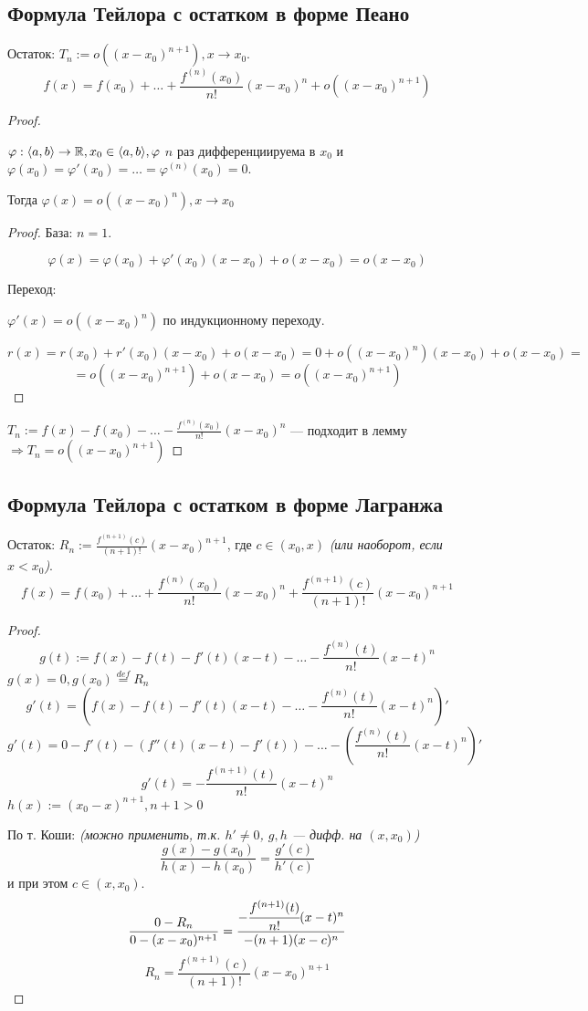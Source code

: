 \subsection{Формула Тейлора с остатком в форме Пеано}
Остаток: $T_n:=o((x-x_0)^{n+1}), x\to x_0$.
$$f(x)=f(x_0)+\ldots+\frac{f^{(n)}(x_0)}{n!}(x-x_0)^n+o((x-x_0)^{n+1})$$
\begin{proof}
    \begin{lemma}
        $\varphi:\langle a,b \rangle \to \mathbb{R}, x_0 \in \langle a,b \rangle, \varphi$ $n$ раз дифференциируема в $x_0$ и $\varphi(x_0)=\varphi'(x_0)=\ldots=\varphi^{(n)}(x_0)=0$.
        
        Тогда $\varphi(x)=o((x-x_0)^n), x\to x_0$
        \begin{proof}
            База: $n=1$.

            $$\varphi(x)=\varphi(x_0)+\varphi'(x_0)(x-x_0)+o(x-x_0)=o(x-x_0)$$

            Переход:

            $\varphi'(x)=o((x-x_0)^n)$ по индукционному переходу.

            $$r(x)=r(x_0)+r'(x_0)(x-x_0)+o(x-x_0)=0+o((x-x_0)^n)(x-x_0)+o(x-x_0)=$$
            $$=o((x-x_0)^{n+1})+o(x-x_0)=o((x-x_0)^{n+1})$$
        \end{proof}
    \end{lemma}

    $T_n:=f(x)-f(x_0)-\ldots-\frac{f^{(n)}(x_0)}{n!}(x-x_0)^n$ --- подходит в лемму $\Rightarrow T_n=o((x-x_0)^{n+1})$
\end{proof}

\subsection{\teormin Формула Тейлора с остатком в форме Лагранжа}
Остаток: $R_n:=\frac{f^{(n+1)}(c)}{(n+1)!}(x-x_0)^{n+1}$, где $c\in(x_0, x)$ \textit{(или наоборот, если $x<x_0$)}.
$$f(x)=f(x_0)+\ldots+\frac{f^{(n)}(x_0)}{n!}(x-x_0)^n+\frac{f^{(n+1)}(c)}{(n+1)!}(x-x_0)^{n+1}$$
\begin{proof}
    $$g(t):=f(x)-f(t)-f'(t)(x-t)-\ldots-\frac{f^{(n)}(t)}{n!}(x-t)^n$$
    $g(x)=0, g(x_0)\stackrel{def}{=}R_n$
    $$g'(t)=\left(f(x)-f(t)-f'(t)(x-t)-\ldots-\frac{f^{(n)}(t)}{n!}(x-t)^n\right)'$$
    $$g'(t)=0-f'(t)-(f''(t)(x-t)-f'(t))-\ldots-\left(\frac{f^{(n)}(t)}{n!}(x-t)^n\right)'$$
    $$g'(t)=-\frac{f^{(n+1)}(t)}{n!}(x-t)^n$$
    $h(x):=(x_0-x)^{n+1}, n+1>0$

    По т. Коши: \textit{(можно применить, т.к. $h'\not=0$, $g,h$ --- дифф. на $(x,x_0)$)}
    $$\frac{g(x)-g(x_0)}{h(x)-h(x_0)}=\frac{g'(c)}{h'(c)}$$
    и при этом $c\in(x,x_0)$.
    $$\frac{0-R_n}{0-(x-x_0)^{n+1}}=\frac{-\cfrac{f^{(n+1)}(t)}{n!}(x-t)^n}{-(n+1)(x-c)^n}$$
    $$R_n=\frac{f^{(n+1)}(c)}{(n+1)!}(x-x_0)^{n+1}$$
\end{proof}

